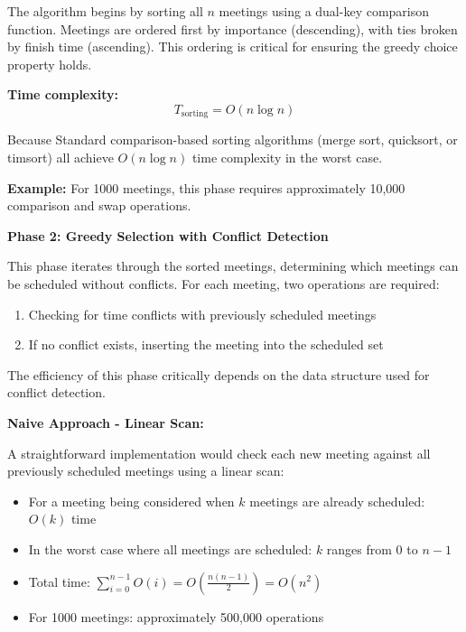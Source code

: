 \documentclass[conference]{IEEEtran}
\begin{document}
The algorithm begins by sorting all $n$ meetings using a dual-key comparison function. Meetings are ordered first by importance (descending), with ties broken by finish time (ascending). This ordering is critical for ensuring the greedy choice property holds.

\textbf{Time complexity:}
\begin{equation}
T_{\text{sorting}} = O(n \log n)
\end{equation}

\text Because Standard comparison-based sorting algorithms (merge sort, quicksort, or timsort) all achieve $O(n \log n)$ time complexity in the worst case.

\textbf{Example:} For 1000 meetings, this phase requires approximately 10,000 comparison and swap operations.

\vspace{0.5em}

\textbf{Phase 2: Greedy Selection with Conflict Detection}

This phase iterates through the sorted meetings, determining which meetings can be scheduled without conflicts. For each meeting, two operations are required:
\begin{enumerate}
    \item Checking for time conflicts with previously scheduled meetings
    \item If no conflict exists, inserting the meeting into the scheduled set
\end{enumerate}

The efficiency of this phase critically depends on the data structure used for conflict detection.

\textbf{Naive Approach - Linear Scan:}

A straightforward implementation would check each new meeting against all previously scheduled meetings using a linear scan:

\begin{itemize}
    \item For a meeting being considered when $k$ meetings are already scheduled: $O(k)$ time
    \item In the worst case where all meetings are scheduled: $k$ ranges from 0 to $n-1$
    \item Total time: $\sum_{i=0}^{n-1} O(i) = O\left(\frac{n(n-1)}{2}\right) = O(n^2)$
    \item For 1000 meetings: approximately 500,000 operations
\end{itemize}
\end{document}
